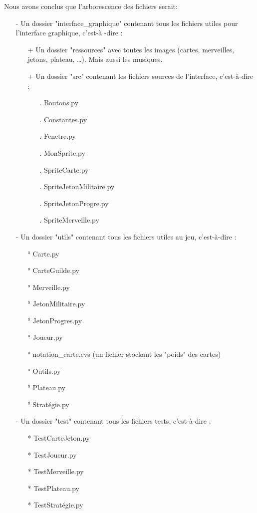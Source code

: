 \documentclass[12pt]{article}
\begin{document}
	Nous avons conclus que l'arborescence des fichiers serait:
	\begin{itemize}
		\item[-] Un dossier "interface\_graphique" contenant tous les fichiers utiles pour l'interface graphique, c'est-à
		-dire :
		\begin{itemize}
			\item[+] Un dossier "ressources" avec toutes les images (cartes, merveilles, jetons, plateau, \ldots). Mais
			aussi les musiques.
			\item[+] Un dossier "src" contenant les fichiers sources de l'interface, c'est-à-dire :
			\begin{itemize}
				\item[.] Boutons.py
				\item[.] Constantes.py
				\item[.] Fenetre.py
				\item[.] MonSprite.py
				\item[.] SpriteCarte.py
				\item[.] SpriteJetonMilitaire.py
				\item[.] SpriteJetonProgre.py
				\item[.] SpriteMerveille.py
			\end{itemize}
		\end{itemize}
		\item[-] Un dossier "utils" contenant tous les fichiers utiles au jeu, c'est-à-dire :
		\begin{itemize}
			\item[°] Carte.py
			\item[°] CarteGuilde.py
			\item[°] Merveille.py
			\item[°] JetonMilitaire.py
			\item[°] JetonProgres.py
			\item[°] Joueur.py
			\item[°] notation\_carte.cvs (un fichier stockant les "poids" des cartes)
			\item[°] Outils.py
			\item[°] Plateau.py
			\item[°] Stratégie.py
		\end{itemize}
		\item[-] Un dossier "test" contenant tous les fichiers tests, c'est-à-dire :
		\begin{itemize}
			\item[*] TestCarteJeton.py
			\item[*] TestJoueur.py
			\item[*] TestMerveille.py
			\item[*] TestPlateau.py
			\item[*] TestStratégie.py
		\end{itemize}
	\end{itemize}
\end{document}
